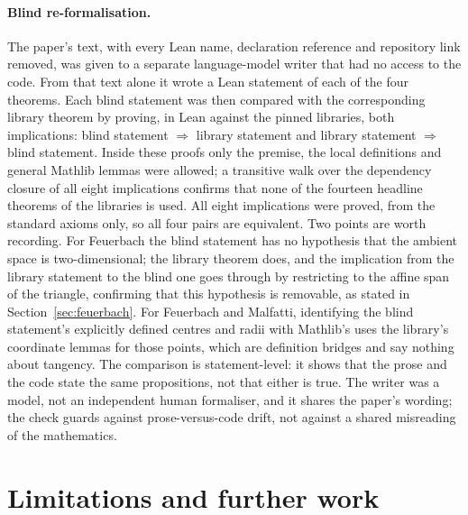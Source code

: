 \documentclass[11pt]{article}
\theoremstyle{definition}
\theoremstyle{remark}
\begin{document}
\paragraph{Blind re-formalisation.} The paper's text, with every Lean name, declaration
reference and repository link removed, was given to a separate language-model writer that had no
access to the code. From that text alone it wrote a Lean statement of each of the four theorems.
Each blind statement was then compared with the corresponding library theorem by proving, in Lean
against the pinned libraries, both implications: blind statement $\Rightarrow$ library statement
and library statement $\Rightarrow$ blind statement. Inside these proofs only the premise, the
local definitions and general Mathlib lemmas were allowed; a transitive walk over the dependency
closure of all eight implications confirms that none of the fourteen headline theorems of the
libraries is used. All eight implications were proved, from the standard axioms only, so all four
pairs are equivalent. Two points are worth recording. For Feuerbach the blind statement has no
hypothesis that the ambient space is two-dimensional; the library theorem does, and the implication
from the library statement to the blind one goes through by restricting to the affine span of the
triangle, confirming that this hypothesis is removable, as stated in Section~\ref{sec:feuerbach}.
For Feuerbach and Malfatti, identifying the blind statement's explicitly defined centres and radii
with Mathlib's uses the library's coordinate lemmas for those points, which are definition bridges
and say nothing about tangency. The comparison is statement-level: it shows that the prose and the
code state the same propositions, not that either is true. The writer was a model, not an
independent human formaliser, and it shares the paper's wording; the check guards against
prose-versus-code drift, not against a shared misreading of the mathematics.

\section{Limitations and further work}\label{sec:limits}
\end{document}
